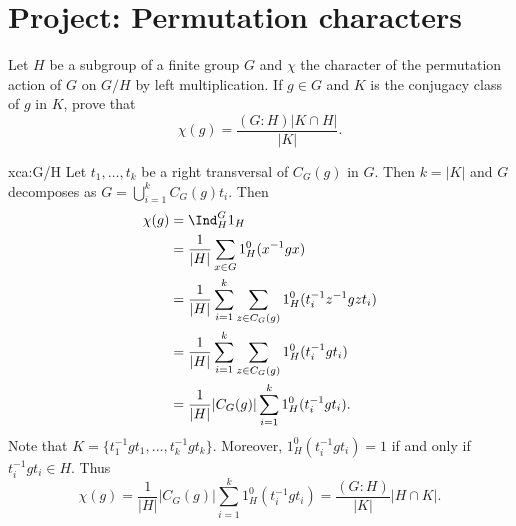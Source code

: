 \section{Project: Permutation characters}

\begin{exercise}
    \label{xca:G/H}
    Let $H$ be a subgroup of a finite group $G$ and 
    $\chi$ the character of the permutation action of $G$ on $G/H$ by
    left multiplication. If $g\in G$ and $K$ is the conjugacy class
    of $g$ in $K$, prove that
    \[
    \chi(g)=\frac{(G:H)|K\cap H|}{|K|}.
    \]
\end{exercise}

\begin{sol}{xca:G/H}
    Let $t_1,\dots,t_k$ be a right transversal of $C_G(g)$ in $G$. Then 
    $k=|K|$ and $G$ decomposes as 
    $G=\bigcup_{i=1}^kC_G(g)t_i$. Then
    \begin{align*}
        \chi(g) &= \Ind_H^G1_H\\
        &=\frac{1}{|H|}\sum_{x\in G}1_H^0(x^{-1}gx)\\
        &=\frac{1}{|H|}\sum_{i=1}^k\sum_{z\in C_G(g)}1_H^0(t_i^{-1}z^{-1}gzt_i)\\
        &=\frac{1}{|H|}\sum_{i=1}^k\sum_{z\in C_G(g)}1_H^0(t_i^{-1}gt_i)\\
        &=\frac{1}{|H|}|C_G(g)|\sum_{i=1}^k1_H^0(t_i^{-1}gt_i).
    \end{align*}
    Note that $K=\{t_1^{-1}gt_1,\dots,t_k^{-1}gt_k\}$. Moreover, 
    $1_H^0(t_i^{-1}gt_i)=1$ if and only if $t_i^{-1}gt_i\in H$. Thus 
    \[
    \chi(g)=\frac{1}{|H|}|C_G(g)|\sum_{i=1}^k1_H^0(t_i^{-1}gt_i)
    =\frac{(G:H)}{|K|}|H\cap K|.
    \]
\end{sol}